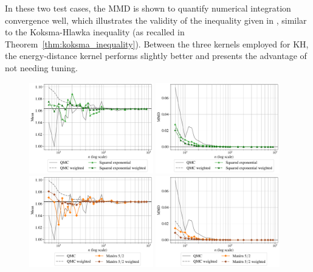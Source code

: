 In these two test cases, the MMD is shown to quantify numerical integration convergence well, which illustrates the validity of the inequality given in , similar to the Koksma-Hlawka inequality (as recalled in Theorem~\ref{thm:koksma_inequality}). 
Between the three kernels employed for KH, the energy-distance kernel performs slightly better and presents the advantage of not needing tuning.

\begin{figure}[!h]
\begin{center}
    \includegraphics[width=0.48\textwidth]{part2/figures/DCE/analytical_bench/Gaussian_Mixture_convergence_SE.pdf}
    \includegraphics[width=0.48\textwidth]{part2/figures/DCE/analytical_bench/Gaussian_Mixture_convergence_MMD_SE.pdf}\\
    \includegraphics[width=0.48\textwidth]{part2/figures/DCE/analytical_bench/Gaussian_Mixture_convergence_Matern.pdf}
    \includegraphics[width=0.48\textwidth]{part2/figures/DCE/analytical_bench/Gaussian_Mixture_convergence_MMD_Matern.pdf}\\

\end{center}
\end{figure}
